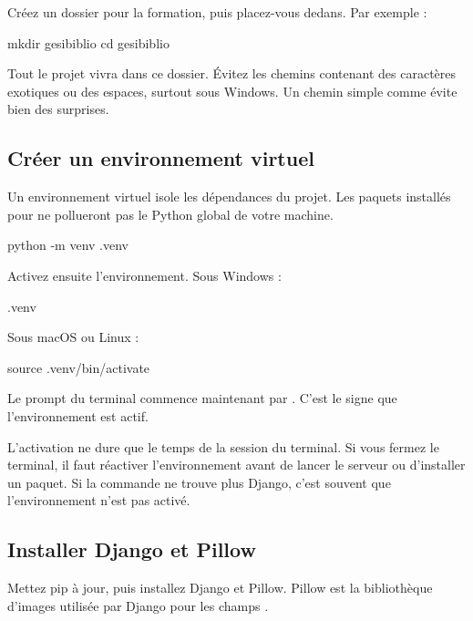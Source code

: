 Créez un dossier pour la formation, puis placez-vous dedans. Par exemple :

\begin{terminal}
mkdir gesibiblio
cd gesibiblio
\end{terminal}

Tout le projet vivra dans ce dossier. Évitez les chemins contenant des caractères
exotiques ou des espaces, surtout sous Windows. Un chemin simple comme
 évite bien des surprises.

\subsection{Créer un environnement virtuel}

Un environnement virtuel isole les dépendances du projet. Les paquets installés
pour \gesibiblio{} ne pollueront pas le Python global de votre machine.

\begin{terminal}
python -m venv .venv
\end{terminal}

Activez ensuite l'environnement. Sous Windows :

\begin{terminal}
.venv\Scripts\activate
\end{terminal}

Sous macOS ou Linux :

\begin{terminal}
source .venv/bin/activate
\end{terminal}

Le prompt du terminal commence maintenant par . C'est le signe que
l'environnement est actif.

\begin{attention}
L'activation ne dure que le temps de la session du terminal. Si vous fermez le
terminal, il faut réactiver l'environnement avant de lancer le serveur ou
d'installer un paquet. Si la commande  ne trouve plus Django, c'est
souvent que l'environnement n'est pas activé.
\end{attention}

\subsection{Installer Django et Pillow}

Mettez pip à jour, puis installez Django et Pillow. Pillow est la bibliothèque
d'images utilisée par Django pour les champs .

